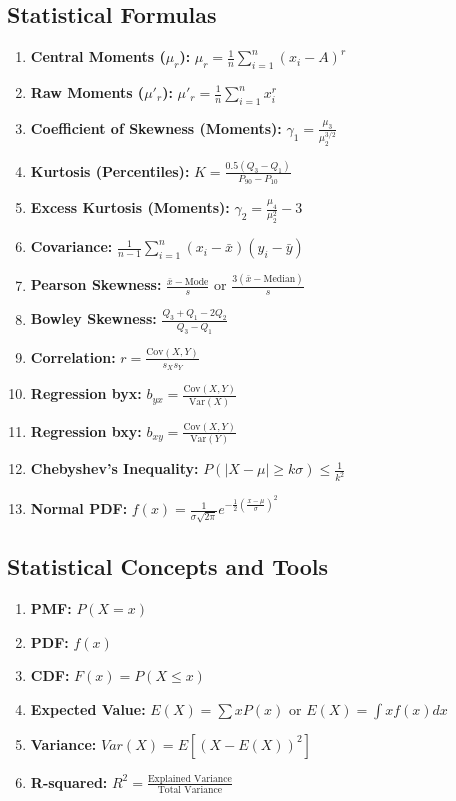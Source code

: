\documentclass{article}
\begin{document}
\subsection*{Statistical Formulas}
\begin{enumerate}
  \item \textbf{Central Moments ($\mu_r$):} $\mu_r = \frac{1}{n} \sum_{i=1}^{n} (x_i - A)^r$
  \item \textbf{Raw Moments ($\mu'_r$):} $\mu'_r = \frac{1}{n} \sum_{i=1}^{n} x_i^r$
   \item \textbf{Coefficient of Skewness (Moments):} $\gamma_1 = \frac{\mu_3}{\mu_2^{3/2}}$
    \item \textbf{Kurtosis (Percentiles):} $K = \frac{0.5(Q_3 - Q_1)}{P_{90} - P_{10}}$
   \item \textbf{Excess Kurtosis (Moments):} $\gamma_2 = \frac{\mu_4}{\mu_2^2} - 3$
     \item \textbf{Covariance:} $\frac{1}{n-1} \sum_{i=1}^{n} (x_i - \bar{x})(y_i - \bar{y})$
    \item \textbf{Pearson Skewness:} $\frac{\bar{x} - \text{Mode}}{s}$ or $\frac{3(\bar{x} - \text{Median})}{s}$
    \item \textbf{Bowley Skewness:} $\frac{Q_3 + Q_1 - 2Q_2}{Q_3 - Q_1}$
    \item \textbf{Correlation:} $r = \frac{\text{Cov}(X, Y)}{s_X s_Y}$
    \item \textbf{Regression byx:} $b_{yx} = \frac{\text{Cov}(X,Y)}{\text{Var}(X)}$
    \item \textbf{Regression bxy:} $b_{xy} = \frac{\text{Cov}(X,Y)}{\text{Var}(Y)}$
       \item \textbf{Chebyshev's Inequality:} $P(|X-\mu| \geq k\sigma) \leq \frac{1}{k^2}$
    \item \textbf{Normal PDF:} $f(x) = \frac{1}{\sigma \sqrt{2\pi}} e^{-\frac{1}{2}(\frac{x - \mu}{\sigma})^2}$
\end{enumerate}

\subsection*{Statistical Concepts and Tools}
\begin{enumerate}
    \item \textbf{PMF:} $P(X = x)$
    \item \textbf{PDF:} $f(x)$
    \item \textbf{CDF:} $F(x) = P(X \leq x)$
    \item \textbf{Expected Value:} $E(X) = \sum xP(x)$ or $E(X) = \int xf(x)dx$
    \item \textbf{Variance:} $Var(X) = E[(X - E(X))^2]$
      \item  \textbf{R-squared:} $R^2 = \frac{\text{Explained Variance}}{\text{Total Variance}}$
  \end{enumerate}
\end{document}

